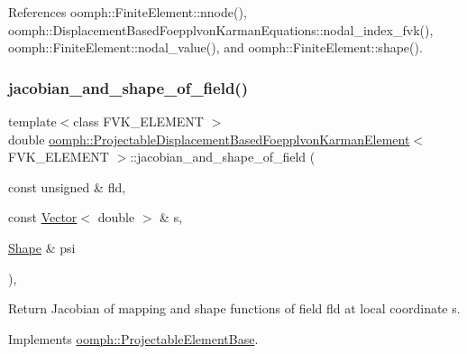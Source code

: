 References oomph\+::\+Finite\+Element\+::nnode(), oomph\+::\+Displacement\+Based\+Foepplvon\+Karman\+Equations\+::nodal\+\_\+index\+\_\+fvk(), oomph\+::\+Finite\+Element\+::nodal\+\_\+value(), and oomph\+::\+Finite\+Element\+::shape().

\mbox{\label{classoomph_1_1ProjectableDisplacementBasedFoepplvonKarmanElement_a03270161594fb96325530ba9d1b6d291}} 
\subsubsection{\texorpdfstring{jacobian\+\_\+and\+\_\+shape\+\_\+of\+\_\+field()}{jacobian\_and\_shape\_of\_field()}}
{\footnotesize\ttfamily template$<$class F\+V\+K\+\_\+\+E\+L\+E\+M\+E\+NT $>$ \\
double \hyperlink{classoomph_1_1ProjectableDisplacementBasedFoepplvonKarmanElement}{oomph\+::\+Projectable\+Displacement\+Based\+Foepplvon\+Karman\+Element}$<$ F\+V\+K\+\_\+\+E\+L\+E\+M\+E\+NT $>$\+::jacobian\+\_\+and\+\_\+shape\+\_\+of\+\_\+field (\begin{DoxyParamCaption}\item[{const unsigned \&}]{fld,  }\item[{const \hyperlink{classoomph_1_1Vector}{Vector}$<$ double $>$ \&}]{s,  }\item[{\hyperlink{classoomph_1_1Shape}{Shape} \&}]{psi }\end{DoxyParamCaption})\hspace{0.3cm}{\ttfamily [inline]}, {\ttfamily [virtual]}}



Return Jacobian of mapping and shape functions of field fld at local coordinate s. 



Implements \hyperlink{classoomph_1_1ProjectableElementBase_ad45c21b58c0985d52f68ab2d79cbb488}{oomph\+::\+Projectable\+Element\+Base}.



